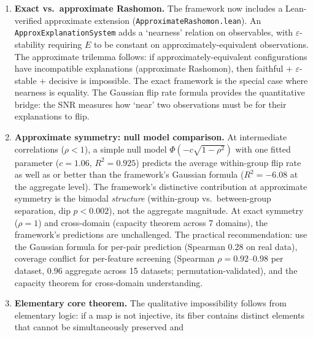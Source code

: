 \documentclass[11pt,a4paper]{article}
\begin{document}
\begin{enumerate}[label=(\arabic*)]
    with both equal FPR and equal FNR.  The only achievable pairwise compromise at
    practical performance is equalized odds (gap $< 0.006$).  Validated on Adult
    Income (sex as protected attribute, base-rate gap 0.20) and synthetic data
    (gap 0.25, 0.40), with bootstrap retraining (20 iterations, 100\% stable).
    This changes the practical recommendation from ``choose a fairness criterion''
    to ``equalized odds is the only achievable criterion at practical performance;
    calibration is structurally incompatible.''
  \item \textbf{Exact vs.\ approximate Rashomon.}  The framework now includes a Lean-verified approximate extension (\texttt{ApproximateRashomon.lean}).  An \texttt{ApproxExplanationSystem} adds a `nearness' relation on observables, with $\varepsilon$-stability requiring $E$ to be constant on approximately-equivalent observations.  The approximate trilemma follows: if approximately-equivalent configurations have incompatible explanations (approximate Rashomon), then faithful + $\varepsilon$-stable + decisive is impossible.  The exact framework is the special case where nearness is equality.  The Gaussian flip rate formula provides the quantitative bridge: the SNR measures how `near' two observations must be for their explanations to flip.
  \item \textbf{Approximate symmetry: null model comparison.}
    At intermediate correlations ($\rho < 1$), a simple null model $\Phi(-c\sqrt{1-\rho^2})$ with one fitted parameter ($c = 1.06$, $R^2 = 0.925$) predicts the average within-group flip rate as well as or better than the framework's Gaussian formula ($R^2 = -6.08$ at the aggregate level). The framework's distinctive contribution at approximate symmetry is the bimodal \emph{structure} (within-group vs.\ between-group separation, dip $p < 0.002$), not the aggregate magnitude. At exact symmetry ($\rho = 1$) and cross-domain (capacity theorem across 7 domains), the framework's predictions are unchallenged. The practical recommendation: use the Gaussian formula for per-pair prediction (Spearman 0.28 on real data), coverage conflict for per-feature screening (Spearman $\rho = 0.92$--$0.98$ per dataset, $0.96$ aggregate across 15 datasets; permutation-validated), and the capacity theorem for cross-domain understanding.
  \item \textbf{Elementary core theorem.}  The qualitative impossibility
    follows from elementary logic: if a map is not injective, its fiber
    contains distinct elements that cannot be simultaneously preserved and

\end{enumerate}
\end{document}

